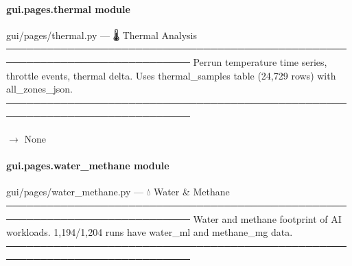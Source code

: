 \documentclass[letterpaper,10pt,english]{sphinxmanual}
\begin{document}
\begin{fulllineitems}
\label{\detokenize{gui.pages.tax:gui.pages.tax.render}}
\pysigstartsignatures
\pysiglinewithargsret
{}
{}
{}
\pysigstopsignatures
\end{fulllineitems}


\sphinxstepscope


\paragraph{gui.pages.thermal module}
\label{\detokenize{gui.pages.thermal:module-gui.pages.thermal}}\label{\detokenize{gui.pages.thermal:gui-pages-thermal-module}}\label{\detokenize{gui.pages.thermal::doc}}
\sphinxAtStartPar
gui/pages/thermal.py  —  🌡  Thermal Analysis
─────────────────────────────────────────────────────────────────────────────
Per\sphinxhyphen{}run temperature time series, throttle events, thermal delta.
Uses thermal\_samples table (24,729 rows) with all\_zones\_json.
─────────────────────────────────────────────────────────────────────────────

\begin{fulllineitems}
\label{\detokenize{gui.pages.thermal:gui.pages.thermal.render}}
\pysigstartsignatures
\pysiglinewithargsret
{}
{}
{{ $\rightarrow$ None}}
\pysigstopsignatures
\end{fulllineitems}


\sphinxstepscope


\paragraph{gui.pages.water\_methane module}
\label{\detokenize{gui.pages.water_methane:module-gui.pages.water_methane}}\label{\detokenize{gui.pages.water_methane:gui-pages-water-methane-module}}\label{\detokenize{gui.pages.water_methane::doc}}
\sphinxAtStartPar
gui/pages/water\_methane.py  —  💧  Water \& Methane
─────────────────────────────────────────────────────────────────────────────
Water and methane footprint of AI workloads.
1,194/1,204 runs have water\_ml and methane\_mg data.
─────────────────────────────────────────────────────────────────────────────
\end{document}
